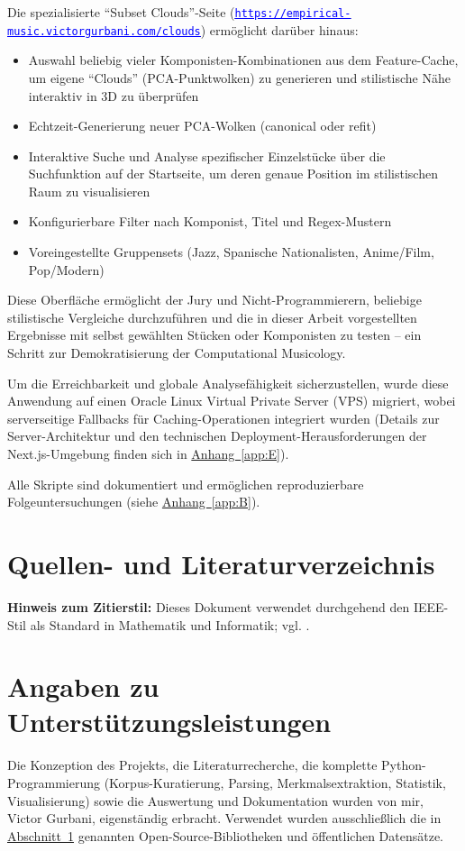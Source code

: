 \documentclass[10pt,a4paper]{article}
\theoremstyle{definition}
\newcommand{\linkurl}[1]{\href{#1}{\textcolor{blue}{\underline{\small\nolinkurl{#1}}}}}
\begin{document}
Die spezialisierte \enquote{Subset Clouds}-Seite (\linkurl{https://empirical-music.victorgurbani.com/clouds}) ermöglicht darüber hinaus:
\begin{itemize}
    \item Auswahl beliebig vieler Komponisten-Kombinationen aus dem Feature-Cache, um eigene \enquote{Clouds} (PCA-Punktwolken) zu generieren und stilistische Nähe interaktiv in 3D zu überprüfen
    \item Echtzeit-Generierung neuer PCA-Wolken (canonical oder refit)
    \item Interaktive Suche und Analyse spezifischer Einzelstücke über die Suchfunktion auf der Startseite, um deren genaue Position im stilistischen Raum zu visualisieren
    \item Konfigurierbare Filter nach Komponist, Titel und Regex-Mustern
    \item Voreingestellte Gruppensets (Jazz, Spanische Nationalisten, Anime/Film, Pop/Modern)
\end{itemize}
Diese Oberfläche ermöglicht der Jury und Nicht-Programmierern, beliebige stilistische Vergleiche durchzuführen und die in dieser Arbeit vorgestellten Ergebnisse mit selbst gewählten Stücken oder Komponisten zu testen -- ein Schritt zur Demokratisierung der Computational Musicology.

Um die Erreichbarkeit und globale Analysefähigkeit sicherzustellen, wurde diese Anwendung auf einen Oracle Linux Virtual Private Server (VPS) migriert, wobei serverseitige Fallbacks für Caching-Operationen integriert wurden (Details zur Server-Architektur und den technischen Deployment-Herausforderungen der Next.js-Umgebung finden sich in \hyperref[app:E]{Anhang~\ref*{app:E}}).

Alle Skripte sind dokumentiert und ermöglichen reproduzierbare Folgeuntersuchungen (siehe \hyperref[app:B]{Anhang~\ref*{app:B}}).

\clearpage
\hypersetup{pageanchor=false}
\section{Quellen- und Literaturverzeichnis}\label{sec:sources}
\textbf{Hinweis zum Zitierstil:} Dieses Dokument verwendet durchgehend den IEEE-Stil als Standard in Mathematik und Informatik; vgl. \cite{IEEEStyle}.
\printbibliography[heading=none]

\clearpage
\section*{Angaben zu Unterstützungsleistungen}
Die Konzeption des Projekts, die Literaturrecherche, die komplette Python-Programmierung (Korpus-Kuratierung, Parsing, Merkmalsextraktion, Statistik, Visualisierung) sowie die Auswertung und Dokumentation wurden von mir, Victor Gurbani, eigenständig erbracht. Verwendet wurden ausschließlich die in \hyperref[sec:sources]{Abschnitt~\ref*{sec:sources}} genannten Open-Source-Bibliotheken und öffentlichen Datensätze. 
\end{document}
